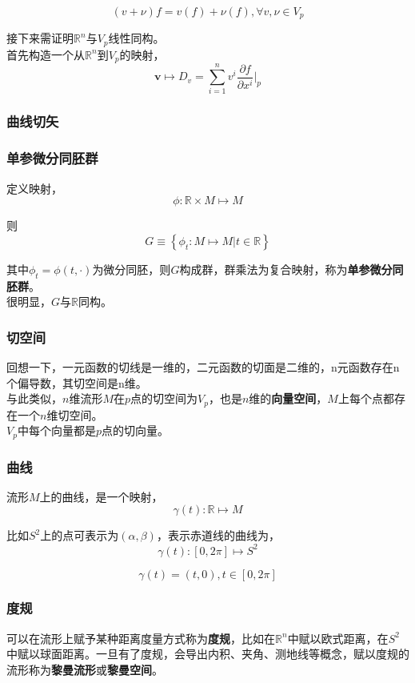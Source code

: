 	$$
		(v + \nu )f = v(f) +\nu(f), \forall v,\nu \in V_p 
	$$

	接下来需证明$\mathbb{R}^n$与$V_p$线性同构。\\

	首先构造一个从$\mathbb{R}^n$到$V_p$的映射，
	$$
		\mathbf{v} \mapsto D_v = \sum_{i=1}^nv^i\frac{\partial f}{\partial x^i}\Big|_p
	$$

\subsubsection*{曲线切矢}


\subsubsection*{单参微分同胚群}
定义映射，
$$
	\phi:\mathbb{R} \times M \mapsto M
$$

则
$$
	G \equiv \left\lbrace \phi_t: M\mapsto M|t \in \mathbb{R} \right\rbrace
$$

其中$\phi_t = \phi(t,\cdot)$为微分同胚，则$G$构成群，群乘法为复合映射，称为\textbf{单参微分同胚群}。\\

很明显，$G$与$\mathbb{R}$同构。


\subsubsection*{切空间}
回想一下，一元函数的切线是一维的，二元函数的切面是二维的，n元函数存在n个偏导数，其切空间是n维。\\

与此类似，$n$维流形$M$在$p$点的切空间为$V_p$，也是$n$维的\textbf{向量空间}，$M$上每个点都存在一个$n$维切空间。\\

$V_p$中每个向量都是$p$点的切向量。

\subsubsection*{曲线}
流形$M$上的曲线，是一个映射，
$$
	\gamma(t): \mathbb{R} \mapsto M
$$

比如$S^2$上的点可表示为$(\alpha,\beta)$，表示赤道线的曲线为，
$$
	\gamma(t): [0,2\pi] \mapsto S^2
$$

$$
	\gamma(t) = (t,0), t\in [0,2\pi]
$$

\subsubsection*{度规}
可以在流形上赋予某种距离度量方式称为\textbf{度规}，比如在$\mathbb{R}^n$中赋以欧式距离，在$S^2$中赋以球面距离。一旦有了度规，会导出内积、夹角、测地线等概念，赋以度规的流形称为\textbf{黎曼流形}或\textbf{黎曼空间}。

